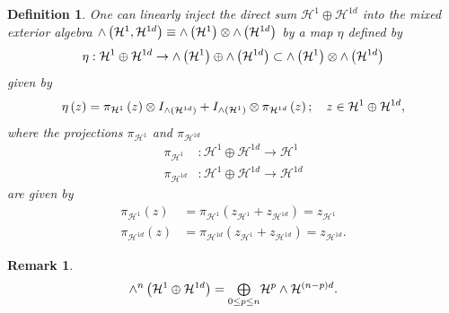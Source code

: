 \documentclass[aps,preprint]{revtex4}%
\newtheorem{definition}[theorem]{Definition}
\newtheorem{remark}[theorem]{Remark}
\begin{document}
\begin{definition}
One can linearly inject the direct sum $\mathcal{H}^{1}\oplus\mathcal{H}^{1d}$
into the mixed exterior algebra ${\huge \wedge}\left(  \mathcal{H}%
^{1},\mathcal{H}^{1d}\right)  \equiv{\huge \wedge}\left(  \mathcal{H}%
^{1}\right)  \otimes{\huge \wedge}\left(  \mathcal{H}^{1d}\right)  $ by a map
$\eta$ defined by
\begin{equation}
\eta:\mathcal{H}^{1}\oplus\mathcal{H}^{1d}\rightarrow{\huge \wedge}\left(
\mathcal{H}^{1}\right)  \oplus{\huge \wedge}\left(  \mathcal{H}^{1d}\right)
\subset{\huge \wedge}\left(  \mathcal{H}^{1}\right)  \otimes{\huge \wedge
}\left(  \mathcal{H}^{1d}\right)
\end{equation}
given by
\begin{equation}
\eta\left(  z\right)  =\pi_{\mathcal{H}^{1}}\left(  z\right)  \otimes
I_{{\huge \wedge}\left(  \mathcal{H}^{1d}\right)  }+I_{{\huge \wedge}\left(
\mathcal{H}^{1}\right)  }\otimes\pi_{\mathcal{H}^{1d}}\left(  z\right)  ;\quad
z\in\mathcal{H}^{1}\oplus\mathcal{H}^{1d},
\end{equation}
where the projections $\pi_{\mathcal{H}^{1}}$ and $\pi_{\mathcal{H}^{1d}}$
\begin{align}
\pi_{\mathcal{H}^{1}}  &  :\mathcal{H}^{1}\oplus\mathcal{H}^{1d}%
\rightarrow\mathcal{H}^{1}\\
\pi_{\mathcal{H}^{1d}}  &  :\mathcal{H}^{1}\oplus\mathcal{H}^{1d}%
\rightarrow\mathcal{H}^{1d}%
\end{align}
are given by
\begin{align}
\pi_{\mathcal{H}^{1}}\left(  z\right)   &  =\pi_{\mathcal{H}^{1}}\left(
z_{\mathcal{H}^{1}}+z_{\mathcal{H}^{1d}}\right)  =z_{\mathcal{H}^{1}}\\
\pi_{\mathcal{H}^{1d}}\left(  z\right)   &  =\pi_{\mathcal{H}^{1d}}\left(
z_{\mathcal{H}^{1}}+z_{\mathcal{H}^{1d}}\right)  =z_{\mathcal{H}^{1d}}.
\end{align}

\end{definition}

\begin{remark}%
\begin{equation}
{\huge \wedge}^{n}\left(  \mathcal{H}^{1}\oplus\mathcal{H}^{1d}\right)  =%
{\textstyle\bigoplus\limits_{0\leq p\leq n}}
\mathcal{H}^{p}\wedge\mathcal{H}^{\left(  n-p\right)  d}.
\end{equation}

\end{remark}
\end{document}
